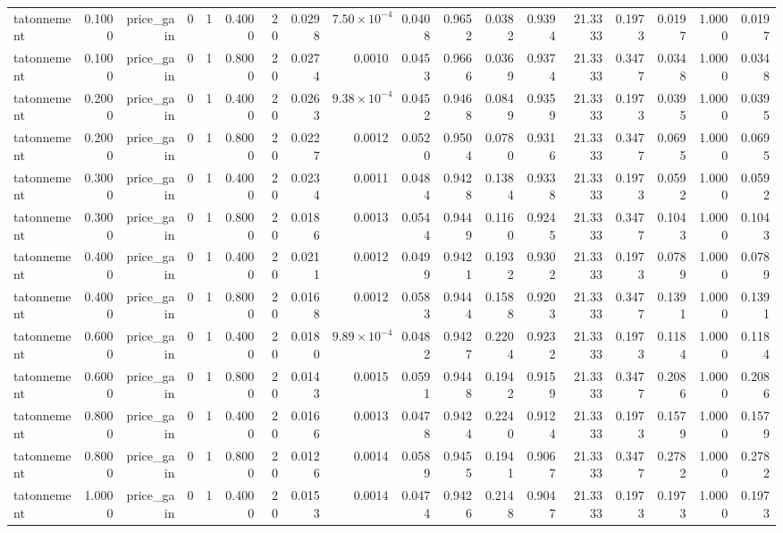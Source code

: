 \begin{table}[htbp]
\begin{tabular}{lrrrrrrrrrrrrrrrrr}
tatonnement & 0.1000 & price\_gain & 0 & 1 & 0.4000 & 20 & 0.0298 & $7.50\times10^{-4}$ & 0.0408 & 0.9652 & 0.0382 & 0.9394 & 21.3333 & 0.1973 & 0.0197 & 1.0000 & 0.0197 \\
tatonnement & 0.1000 & price\_gain & 0 & 1 & 0.8000 & 20 & 0.0274 & 0.0010 & 0.0453 & 0.9666 & 0.0369 & 0.9374 & 21.3333 & 0.3477 & 0.0348 & 1.0000 & 0.0348 \\
tatonnement & 0.2000 & price\_gain & 0 & 1 & 0.4000 & 20 & 0.0263 & $9.38\times10^{-4}$ & 0.0452 & 0.9468 & 0.0849 & 0.9359 & 21.3333 & 0.1973 & 0.0395 & 1.0000 & 0.0395 \\
tatonnement & 0.2000 & price\_gain & 0 & 1 & 0.8000 & 20 & 0.0227 & 0.0012 & 0.0520 & 0.9504 & 0.0780 & 0.9316 & 21.3333 & 0.3477 & 0.0695 & 1.0000 & 0.0695 \\
tatonnement & 0.3000 & price\_gain & 0 & 1 & 0.4000 & 20 & 0.0234 & 0.0011 & 0.0484 & 0.9428 & 0.1384 & 0.9338 & 21.3333 & 0.1973 & 0.0592 & 1.0000 & 0.0592 \\
tatonnement & 0.3000 & price\_gain & 0 & 1 & 0.8000 & 20 & 0.0186 & 0.0013 & 0.0544 & 0.9449 & 0.1160 & 0.9245 & 21.3333 & 0.3477 & 0.1043 & 1.0000 & 0.1043 \\
tatonnement & 0.4000 & price\_gain & 0 & 1 & 0.4000 & 20 & 0.0211 & 0.0012 & 0.0499 & 0.9421 & 0.1932 & 0.9302 & 21.3333 & 0.1973 & 0.0789 & 1.0000 & 0.0789 \\
tatonnement & 0.4000 & price\_gain & 0 & 1 & 0.8000 & 20 & 0.0168 & 0.0012 & 0.0583 & 0.9444 & 0.1588 & 0.9203 & 21.3333 & 0.3477 & 0.1391 & 1.0000 & 0.1391 \\
tatonnement & 0.6000 & price\_gain & 0 & 1 & 0.4000 & 20 & 0.0180 & $9.89\times10^{-4}$ & 0.0482 & 0.9427 & 0.2204 & 0.9232 & 21.3333 & 0.1973 & 0.1184 & 1.0000 & 0.1184 \\
tatonnement & 0.6000 & price\_gain & 0 & 1 & 0.8000 & 20 & 0.0143 & 0.0015 & 0.0591 & 0.9448 & 0.1942 & 0.9159 & 21.3333 & 0.3477 & 0.2086 & 1.0000 & 0.2086 \\
tatonnement & 0.8000 & price\_gain & 0 & 1 & 0.4000 & 20 & 0.0166 & 0.0013 & 0.0478 & 0.9424 & 0.2240 & 0.9124 & 21.3333 & 0.1973 & 0.1579 & 1.0000 & 0.1579 \\
tatonnement & 0.8000 & price\_gain & 0 & 1 & 0.8000 & 20 & 0.0126 & 0.0014 & 0.0589 & 0.9455 & 0.1941 & 0.9067 & 21.3333 & 0.3477 & 0.2782 & 1.0000 & 0.2782 \\
tatonnement & 1.0000 & price\_gain & 0 & 1 & 0.4000 & 20 & 0.0153 & 0.0014 & 0.0474 & 0.9426 & 0.2148 & 0.9047 & 21.3333 & 0.1973 & 0.1973 & 1.0000 & 0.1973 \\

\end{tabular}
\end{table}
